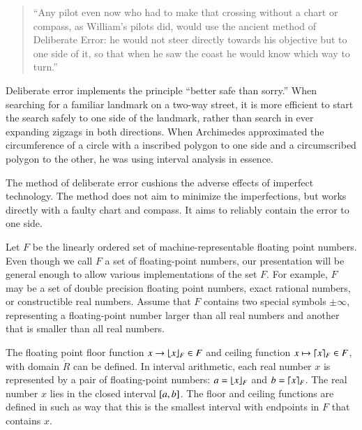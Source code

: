 \begin{quote}
  ``Any pilot even now who had to make that crossing without a chart
  or compass, as William's pilots did, would use the ancient method of
  Deliberate Error: he would not steer directly towards his objective
  but to one side of it, so that when he saw the coast he would know
  which way to turn.'' \cite[p81]{How81}
\end{quote}

Deliberate error implements the principle ``better safe than sorry.''
When searching for a familiar landmark on a two-way street, it is more
efficient to start the search safely to one side of the landmark,
rather than search in ever expanding zigzags in both directions.  When
Archimedes approximated the circumference of a circle with a inscribed
polygon to one side and a circumscribed polygon to the other, he was
using interval analysis in essence.


The method of deliberate error cushions the adverse effects of
imperfect technology.  The method does not aim to minimize the
imperfections, but works directly with a faulty chart and compass.  It
aims to reliably contain the error to one side.


Let $F$ be the linearly ordered set of machine-representable floating
point numbers.  Even though we call $F$ a set of floating-point
numbers, our presentation will be general enough to allow various
implementations of the set $F$.  For example, $F$ may be a set of
double precision floating point numbers, exact rational numbers, or
constructible real numbers.  Assume that $F$ contains two special
symbols $\pm\infty$, representing a floating-point number larger than
all real numbers and another that is smaller than all real numbers.

The floating point floor function $x\to\lfloor x\rfloor_F\in
F$ and ceiling function $x\mapsto\lceil x\rceil_F\in F$, with domain
$\ring{R}$ can be defined.  In interval arithmetic, each real number
$x$ is represented by a pair of floating-point numbers:
$a=\lfloor x\rfloor_F$ and $b=\lceil x\rceil_F$. The real number $x$ lies in the
closed interval $[ a,b]$.  The floor and ceiling
functions are defined in such as way that this is the smallest interval with
endpoints in $F$ that contains $x$.

